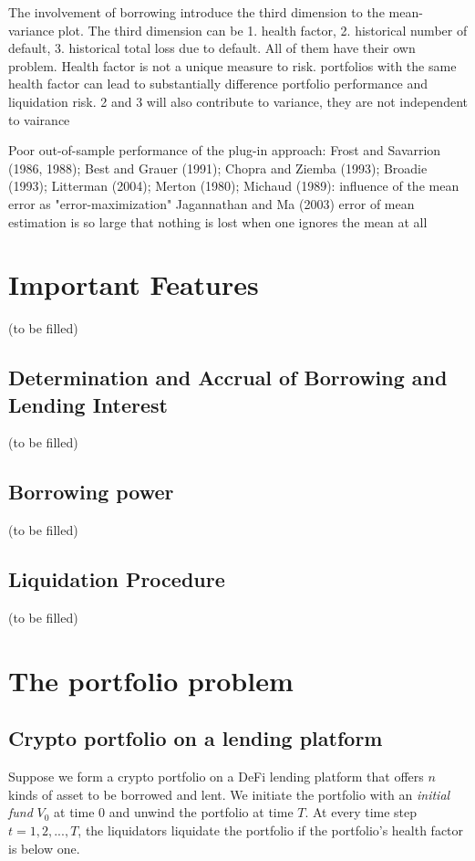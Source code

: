 \documentclass{article} %
\theoremstyle{plain}
\theoremstyle{definition} %
\begin{document}
The involvement of borrowing introduce the third dimension to the mean-variance plot. 
 The third dimension can be 1. health factor, 2. historical number of default, 3. historical total loss due to default. 
 All of them have their own problem.
 Health factor is not a unique measure to risk. portfolios with the same health factor can lead to substantially difference portfolio performance and liquidation risk.
 2 and 3 will also contribute to variance, they are not independent to vairance

Poor out-of-sample performance of the plug-in approach: Frost and Savarrion (1986, 1988); Best and Grauer (1991); Chopra and Ziemba (1993); Broadie (1993); 
Litterman (2004); Merton (1980); 
Michaud (1989): influence of the mean error as "error-maximization"
Jagannathan and Ma (2003) error of mean estimation is so large that nothing is lost when one ignores the mean at all


\section{Important Features}
(to be filled)
\subsection{Determination and Accrual of Borrowing and Lending Interest}
(to be filled)
\subsection{Borrowing power}
(to be filled)
\subsection{Liquidation Procedure}
(to be filled)


\section{The portfolio problem}
\subsection{Crypto portfolio on a lending platform}
Suppose we form a crypto portfolio on a DeFi lending platform that offers $n$ kinds of asset to be borrowed and lent. 
 We initiate the portfolio with an \textit{initial fund} $V_0$ at time $0$ and unwind the portfolio at time $T$.
 At every time step $t=1,2,...,T$, the liquidators liquidate the portfolio if the portfolio's health factor is below one.\\
\end{document}
